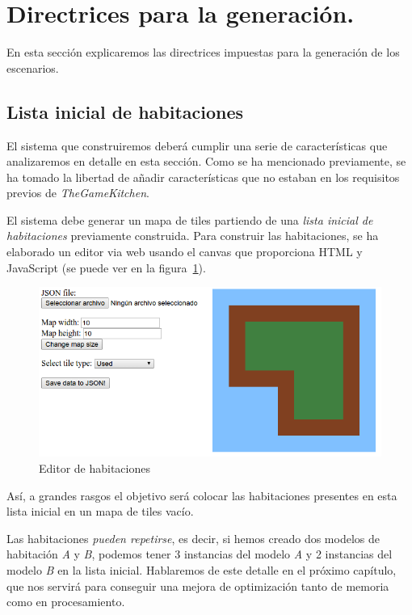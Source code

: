 \section{Directrices para la generación.}

En esta sección explicaremos las directrices impuestas para la generación de los escenarios.


\subsection{Lista inicial de habitaciones}

El sistema que construiremos deberá cumplir una serie de características que analizaremos en detalle en esta sección. Como se ha mencionado previamente, se ha tomado la libertad de añadir características que no estaban en los requisitos previos de \emph{TheGameKitchen}\cite{tgc}.

El sistema debe generar un mapa de tiles partiendo de una \emph{lista inicial de habitaciones} previamente construida. Para construir las habitaciones, se ha elaborado un editor via web usando el canvas que proporciona HTML y JavaScript (se puede ver en la figura~\ref{fig:roomed}).

\begin{figure}[t]
\centering
\includegraphics[scale=0.5]{img/roomed}
\caption{Editor de habitaciones
\label{fig:roomed}}
\end{figure}

Así, a grandes rasgos el objetivo será colocar las habitaciones presentes en esta lista inicial en un mapa de tiles vacío.

Las habitaciones \emph{pueden repetirse}, es decir, si hemos creado dos modelos de habitación \emph{A} y \emph{B}, podemos tener 3 instancias del modelo \emph{A} y 2 instancias del modelo \emph{B} en la lista inicial. Hablaremos de este detalle en el próximo capítulo, que nos servirá para conseguir una mejora de optimización tanto de memoria como en procesamiento.

